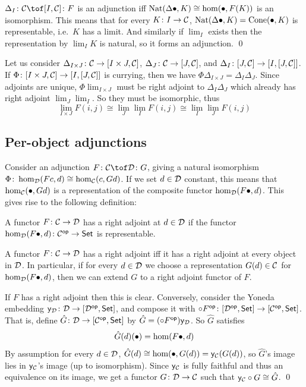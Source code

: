 \bproof

    $\Delta_I\colon\C\tof[I,\C]\colon F$ is an adjunction iff ${\rm Nat}(\Delta\bullet,K)\cong\hom(\bullet,F(K))$ is an isomorphism.
    This means that for every $K\colon I\to{{\cal C}}$, ${\rm Nat}(\Delta\bullet,K)={\rm Cone}(\bullet,K)$ is representable, i.e.\ $K$ has a limit.
    And similarly if $\lim_I$ exists then the representation by $\lim_IK$ is natural, so it forms an adjunction.
    \qed

\eproof

Let us consider $\Delta_{I\times J}\colon{{\cal C}}\to[I\times J,{{\cal C}}]$, $\Delta_J\colon{{\cal C}}\to[J,{{\cal C}}]$, and $\Delta_I\colon[J,{{\cal C}}]\to[I,[J,{{\cal C}}]]$.
If $\Phi\colon[I\times J,{{\cal C}}]\to[I,[J,{{\cal C}}]]$ is currying, then we have $\Phi\Delta_{I\times J}=\Delta_I\Delta_J$.
Since adjoints are unique, $\Phi\lim_{I\times J}$ must be right adjoint to $\Delta_I\Delta_J$ which already has right adjoint $\lim_J\lim_I$.
So they must be isomorphic, thus
$$ \lim_{I\times J}F(i,j) \cong \lim_J\lim_IF(i,j) \cong \lim_I\lim_JF(i,j) $$

\subsection{Per-object adjunctions}

Consider an adjunction $F\colon\C\tof\D\colon G$, giving a natural isomorphism $\Phi\colon\hom_{{\cal D}}(Fc,d)\cong\hom_{{\cal C}}(c,Gd)$.
If we set $d\in{{\cal D}}$ constant, this means that $\hom_{{\cal C}}(\bullet,Gd)$ is a representation of the composite functor $\hom_{{\cal D}}(F\bullet,d)$.
This gives rise to the following definition:

\bdefn

    A functor $F\colon{{\cal C}}\to{{\cal D}}$ has a {\emphcolor right adjoint at $d\in{{\cal D}}$} if the functor $\hom_{{\cal D}}(F\bullet,d)\colon{{\cal C}}^{\sf op}\to{\sf Set}$ is representable.

\edefn

\bthrm

    A functor $F\colon{{\cal C}}\to{{\cal D}}$ has a right adjoint iff it has a right adjoint at every object in ${{\cal D}}$.
    In particular, if for every $d\in{{\cal D}}$ we choose a representation $G(d)\in{{\cal C}}$ for $\hom_{{\cal D}}(F\bullet,d)$, then we can extend $G$ to a right adjoint functor of $F$.

\ethrm

\bproof

    If $F$ has a right adjoint then this is clear.
    Conversely, consider the Yoneda embedding ${\sf y}_{{\cal D}}\colon{{\cal D}}\to[{{\cal D}}^{\sf op},{\sf Set}]$, and compose it with $\circ F^{\sf op}\colon[{{\cal D}}^{\sf op},{\sf Set}]\to[{{\cal C}}^{\sf op},{\sf Set}]$.
    That is, define $\hat G\colon{{\cal D}}\to[{{\cal C}}^{\sf op},{\sf Set}]$ by $\hat G=(\circ F^{\sf op}){\sf y}_{{\cal D}}$.
    So $\hat G$ satisfies
    $$ \hat G(d)(\bullet) = \hom(F\bullet,d) $$
    By assumption for every $d\in{{\cal D}}$, $\hat G(d)\cong\hom(\bullet,G(d))={\sf y}_{{\cal C}}(G(d))$, so $\hat G$'s image lies in ${\sf y}_{{\cal C}}$'s image (up to isomorphism).
    Since ${\sf y}_{{\cal C}}$ is fully faithful and thus an equivalence on its image, we get a functor $G\colon{{\cal D}}\to{{\cal C}}$ such that ${\sf y}_{{\cal C}}\circ G\cong\hat G$.
    \qed

